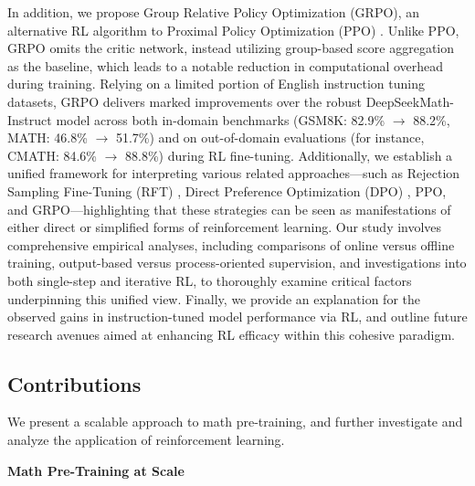 In addition, we propose Group Relative Policy Optimization (GRPO), an alternative RL algorithm to Proximal Policy Optimization (PPO) \citep{schulman2017proximal}. Unlike PPO, GRPO omits the critic network, instead utilizing group-based score aggregation as the baseline, which leads to a notable reduction in computational overhead during training. Relying on a limited portion of English instruction tuning datasets, GRPO delivers marked improvements over the robust DeepSeekMath-Instruct model across both in-domain benchmarks (GSM8K: 82.9\% $\rightarrow$ 88.2\%, MATH: 46.8\% $\rightarrow$ 51.7\%) and on out-of-domain evaluations (for instance, CMATH: 84.6\% $\rightarrow$ 88.8\%) during RL fine-tuning. Additionally, we establish a unified framework for interpreting various related approaches—such as Rejection Sampling Fine-Tuning (RFT) \citep{yuan2023scaling}, Direct Preference Optimization (DPO) \citep{dpo}, PPO, and GRPO—highlighting that these strategies can be seen as manifestations of either direct or simplified forms of reinforcement learning. Our study involves comprehensive empirical analyses, including comparisons of online versus offline training, output-based versus process-oriented supervision, and investigations into both single-step and iterative RL, to thoroughly examine critical factors underpinning this unified view. Finally, we provide an explanation for the observed gains in instruction-tuned model performance via RL, and outline future research avenues aimed at enhancing RL efficacy within this cohesive paradigm.

\subsection{Contributions}
We present a scalable approach to math pre-training, and further investigate and analyze the application of reinforcement learning.

\textbf{Math Pre-Training at Scale}

